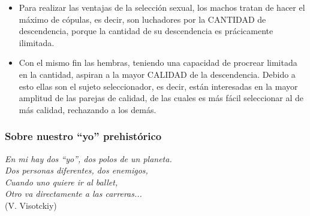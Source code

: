 \begin{itemize}

\item
  Para realizar las ventajas de la selección sexual, los machos tratan
  de hacer el máximo de cópulas, es decir, son luchadores por la
  CANTIDAD de descendencia, porque la cantidad de su descendencia es
  prácicamente ilimitada.
\item
  Con el mismo fin las hembras, teniendo una capacidad de procrear
  limitada en la cantidad, aspiran a la mayor CALIDAD de la
  descendencia. Debido a esto ellas son el sujeto seleccionador, es
  decir, están interesadas en la mayor amplitud de las parejas de
  calidad, de las cuales es más fácil seleccionar al de más calidad,
  rechazando a los demás.
\end{itemize}

\protect\hypertarget{M7}{}{}

\subsubsection{Sobre nuestro ``yo'' prehistórico}

\noindent
\textit{En mi hay dos ``yo'', dos polos de un planeta.}\\
\textit{Dos personas diferentes, dos enemigos,}\\
\textit{Cuando uno quiere ir al ballet,}\\
\textit{Otro va directamente a las carreras...}\\
(V. Visotckiy)\\



